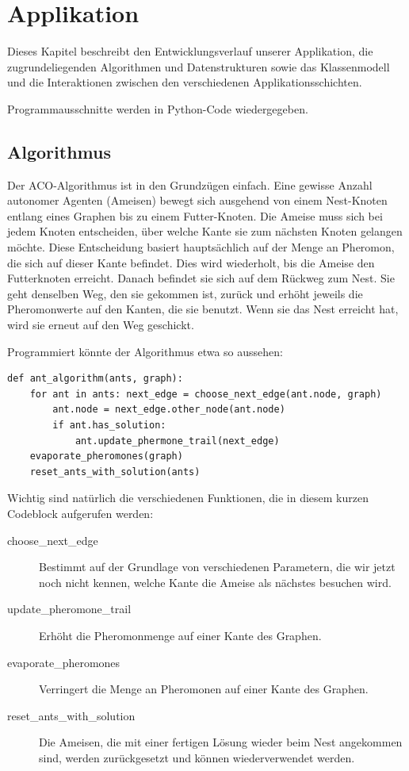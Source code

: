

\chapter{Applikation}

Dieses Kapitel beschreibt den Entwicklungsverlauf unserer Applikation, die
zugrundeliegenden Algorithmen und Datenstrukturen sowie das Klassenmodell und
die Interaktionen zwischen den verschiedenen Applikationsschichten.

Programmausschnitte werden  in Python-Code wiedergegeben.

\section{Algorithmus}\label{sec:algorithm}

Der ACO-Algorithmus ist in den Grundzügen einfach. Eine gewisse Anzahl autonomer
Agenten (Ameisen) bewegt sich ausgehend von einem Nest-Knoten entlang eines
Graphen bis zu einem Futter-Knoten. Die Ameise muss sich bei jedem Knoten
entscheiden, über welche Kante sie zum nächsten Knoten gelangen möchte. Diese
Entscheidung basiert hauptsächlich auf der Menge an Pheromon, die sich auf
dieser Kante befindet. Dies wird wiederholt, bis die Ameise den Futterknoten
erreicht. Danach befindet sie sich auf dem Rückweg zum Nest. Sie geht denselben
Weg, den sie gekommen ist, zurück und erhöht jeweils die Pheromonwerte auf den
Kanten, die sie benutzt. Wenn sie das Nest erreicht hat, wird sie erneut auf den
Weg geschickt.

Programmiert könnte der Algorithmus etwa so aussehen:

\lstset{language=Python} 
\begin{lstlisting} 
def ant_algorithm(ants, graph): 
	for ant in ants: next_edge = choose_next_edge(ant.node, graph) 
		ant.node = next_edge.other_node(ant.node) 
		if ant.has_solution:
			ant.update_phermone_trail(next_edge) 
	evaporate_pheromones(graph)
	reset_ants_with_solution(ants) 
\end{lstlisting}

\noindent Wichtig sind natürlich die verschiedenen Funktionen, die in diesem
kurzen Codeblock aufgerufen werden:

\begin{description} \item[choose\_next\_edge] Bestimmt auf der Grundlage von
verschiedenen Parametern, die wir jetzt noch nicht kennen, welche Kante die
Ameise als nächstes besuchen wird. \item[update\_pheromone\_trail] Erhöht die
Pheromonmenge auf einer Kante des Graphen. \item[evaporate\_pheromones]
Verringert die Menge an Pheromonen auf einer Kante des Graphen.
\item[reset\_ants\_with\_solution] Die Ameisen, die mit einer fertigen Lösung
wieder beim Nest angekommen sind, werden zurückgesetzt und können
wiederverwendet werden. \end{description}

